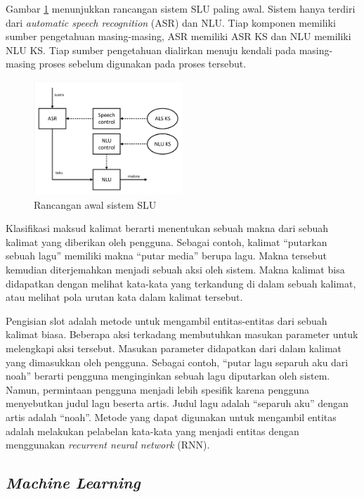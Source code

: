 Gambar \ref{fig:slu_early} menunjukkan rancangan sistem SLU paling awal. Sistem hanya terdiri dari \textit{automatic speech recognition} (ASR) dan NLU. Tiap komponen memiliki sumber pengetahuan masing-masing, ASR memiliki ASR KS dan NLU memiliki NLU KS. Tiap sumber pengetahuan dialirkan menuju kendali pada masing-masing proses sebelum digunakan pada proses tersebut.

\begin{figure}[H]
	\centering
	\includegraphics[width=0.5\textwidth, trim=2 2 2 2, clip]{resources/2/early_slu.pdf}
	\caption{Rancangan awal sistem SLU \parencite{tur2011spoken}}
	\label{fig:slu_early}
\end{figure}

Klasifikasi maksud kalimat berarti menentukan sebuah makna dari sebuah kalimat yang diberikan oleh pengguna. Sebagai contoh, kalimat “putarkan sebuah lagu” memiliki makna “putar media” berupa lagu. Makna tersebut kemudian diterjemahkan menjadi sebuah aksi oleh sistem. Makna kalimat bisa didapatkan dengan melihat kata-kata yang terkandung di dalam sebuah kalimat, atau melihat pola urutan kata dalam kalimat tersebut.

Pengisian slot adalah metode untuk mengambil entitas-entitas dari sebuah kalimat biasa. Beberapa aksi terkadang membutuhkan masukan parameter untuk melengkapi aksi tersebut. Masukan parameter didapatkan dari dalam kalimat yang dimasukkan oleh pengguna. Sebagai contoh, “putar lagu separuh aku dari noah” berarti pengguna menginginkan sebuah lagu diputarkan oleh sistem. Namun, permintaan pengguna menjadi lebih spesifik karena pengguna menyebutkan judul lagu beserta artis. Judul lagu adalah “separuh aku” dengan artis adalah “noah”. Metode yang dapat digunakan untuk mengambil entitas adalah melakukan pelabelan kata-kata yang menjadi entitas dengan menggunakan \textit{recurrent neural network} (RNN).

\subsection{\textit{Machine Learning}}

